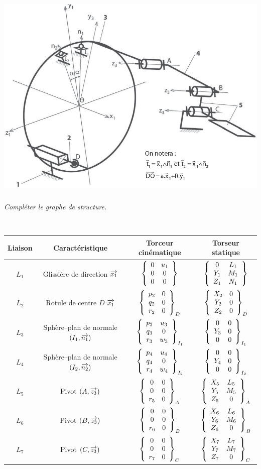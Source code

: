 \documentclass[10pt,fleqn]{article} %
\begin{document}
\begin{multicols}{2}
\begin{center}
\includegraphics[width=\linewidth]{images/fig_03}
\textit{}
\end{center}


\subparagraph{}\textit{Compléter le graphe de structure.}%
\ifprof
\begin{corrige}~\\
\begin{center}
\begin{tabular}{|c|c|c|c|}
\hline
Liaison & Caractéristique & Torceur cinématique & Torseur statique \\
\hline\hline
$L_1 $ & Glissière de direction $\vect{x_1}$ & 
$\torseurcol{0}{0}{0}{u_1}{0}{0}{}$ & 
$\torseurcol{0}{Y_1}{Z_1}{L_1}{M_1}{N_1}{}$ \\ \hline
$L_2 $ & Rotule de centre $D$ $\vect{x_1}$ & 
$\torseurcol{p_2}{q_2}{r_2}{0}{0}{0}{D}$ & 
$\torseurcol{X_2}{Y_2}{Z_2}{0}{0}{0}{D}$ \\ \hline
$L_3 $ & Sphère--plan de normale $\left(I_1,\vect{n_1}\right)$ & 
$\torseurcol{p_3}{q_3}{r_3}{u_3}{0}{w_3}{I_1}$ & 
$\torseurcol{0}{Y_3}{0}{0}{0}{0}{I_1}$ \\ \hline
$L_4 $ & Sphère--plan de normale $\left(I_2,\vect{n_2}\right)$ & 
$\torseurcol{p_4}{q_4}{r_4}{u_4}{0}{w_4}{I_2}$ & 
$\torseurcol{0}{Y_4}{0}{0}{0}{0}{I_2}$ \\ \hline
$L_5 $ & Pivot $\left(A,\vect{z_3}\right)$ & 
$\torseurcol{0}{0}{r_5}{0}{0}{0}{A}$ & 
$\torseurcol{X_5}{Y_5}{Z_5}{L_5}{M_5}{0}{A}$ \\ \hline
$L_6 $ & Pivot $\left(B,\vect{z_3}\right)$ & 
$\torseurcol{0}{0}{r_6}{0}{0}{0}{B}$ & 
$\torseurcol{X_6}{Y_6}{Z_6}{L_6}{M_6}{0}{B}$ \\ \hline
$L_7 $ & Pivot $\left(C,\vect{z_3}\right)$ & 
$\torseurcol{0}{0}{r_7}{0}{0}{0}{C}$ & 
$\torseurcol{X_7}{Y_7}{Z_7}{L_7}{M_7}{0}{C}$ \\ \hline
\end{tabular}
\end{center}
\end{corrige}
\else
\fi


\end{multicols}
\end{document}
